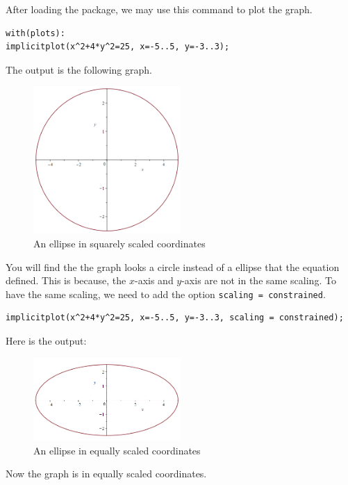 \documentclass[
  12pt]{elegantbook}
\begin{document}
\begin{solution}
After loading the package, we may use this command to plot the graph.

\begin{verbatim}
with(plots):
implicitplot(x^2+4*y^2=25, x=-5..5, y=-3..3);
\end{verbatim}

The output is the following graph.

\begin{figure}
\centering
\includegraphics[width=0.5\textwidth,height=\textheight]{figs/unconstrainedellipse.png}
\caption{An ellipse in squarely scaled coordinates}
\end{figure}

You will find the the graph looks a circle instead of a ellipse that the equation defined. This is because, the \(x\)-axis and \(y\)-axis are not in the same scaling. To have the same scaling, we need to add the option \texttt{scaling\ =\ constrained}.

\begin{verbatim}
implicitplot(x^2+4*y^2=25, x=-5..5, y=-3..3, scaling = constrained);
\end{verbatim}

Here is the output:

\begin{figure}
\centering
\includegraphics[width=0.5\textwidth,height=\textheight]{figs/ellipse.png}
\caption{An ellipse in equally scaled coordinates}
\end{figure}

Now the graph is in equally scaled coordinates.
\end{solution}
\end{document}
